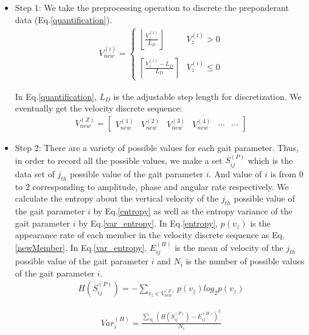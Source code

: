 \begin{itemize}
	\item Step 1: We take the preprocessing operation to discrete the preponderant data (Eq.\ref{quantification}).
	\begin{eqnarray}\label{quantification}
	V_{new}^{(i)}=\left\{
	\begin{array}{lr}
	\left \lfloor \frac{V_{z}^{(i)}}{L_{D}} \right \rfloor&V_{z}^{(i)}> 0\\
	\\
	\left \lceil \frac{V_{z}^{(i)}-L_{D}}{L_{D}} \right \rceil&V_{z}^{(i)}\leq 0
	\end{array}
	\right.
	\end{eqnarray}
	
	In Eq.\ref{quantification}, $L_{D}$ is the adjustable step length for discretization. We eventually get the velocity discrete sequence:
	\begin{eqnarray}\label{newMember}
	V_{new}^{(Z)}=\begin{bmatrix}
	V_{new}^{(1)} & V_{new}^{(2)} & V_{new}^{(3)} & V_{new}^{(4)} & \cdots & \cdots
	\end{bmatrix}
	\end{eqnarray}
	
	\item Step 2: There are a variety of possible values for each gait parameter. Thus, in order to record all the possible values, we make a set $S_{ij}^{(P)}$ which is the data set of $j_{th}$ possible value of the gait parameter $i$. And value of $i$ is from 0 to 2 corresponding to amplitude, phase and angular rate respectively. We calculate the entropy about the vertical velocity of the $j_{th}$ possible value of the gait parameter $i$ by Eq.\ref{entropy} as well as the entropy variance of the gait parameter $i$ by Eq.\ref{var_entropy}. In Eq.\ref{entropy}, $p(v_{z})$ is the appearance rate of each member in the velocity discrete sequence as Eq.\ref{newMember}. In Eq.\ref{var_entropy}, $E_{ij}^{(H)}$ is the mean of velocity of  the $j_{th}$ possible value of the gait parameter $i$ and $N_{i}$ is the number of possible values of the gait parameter $i$.
	\begin{eqnarray}\label{entropy}
	H(S_{ij}^{(P)})=-\sum _{v_{z}\in V_{new}^{(Z)}}p(v_{z})log_{2}p(v_{z})
	\end{eqnarray}
	
	\begin{eqnarray}\label{var_entropy}
	Var_{i}^{(H)}=\frac{\sum _{N_{i}}(H(S_{ij}^{(P)})-E_{ij}^{(H)})^{2}}{N_{i}}
	\end{eqnarray}
	

\end{itemize}
